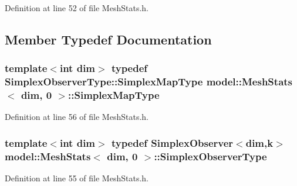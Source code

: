 Definition at line 52 of file Mesh\+Stats.\+h.



\subsection{Member Typedef Documentation}
\hypertarget{structmodel_1_1_mesh_stats_3_01dim_00_010_01_4_a9432efdd50cd41d86ceff02400fc4801}{}
\subsubsection[{Simplex\+Map\+Type}]{\setlength{\rightskip}{0pt plus 5cm}template$<$int dim$>$ typedef {\bf Simplex\+Observer\+Type\+::\+Simplex\+Map\+Type} {\bf model\+::\+Mesh\+Stats}$<$ {\bf dim}, 0 $>$\+::{\bf Simplex\+Map\+Type}}\label{structmodel_1_1_mesh_stats_3_01dim_00_010_01_4_a9432efdd50cd41d86ceff02400fc4801}


Definition at line 56 of file Mesh\+Stats.\+h.

\hypertarget{structmodel_1_1_mesh_stats_3_01dim_00_010_01_4_adca31e4696e0ce0cf499436a2e8c0916}{}
\subsubsection[{Simplex\+Observer\+Type}]{\setlength{\rightskip}{0pt plus 5cm}template$<$int dim$>$ typedef {\bf Simplex\+Observer}$<${\bf dim},{\bf k}$>$ {\bf model\+::\+Mesh\+Stats}$<$ {\bf dim}, 0 $>$\+::{\bf Simplex\+Observer\+Type}}\label{structmodel_1_1_mesh_stats_3_01dim_00_010_01_4_adca31e4696e0ce0cf499436a2e8c0916}


Definition at line 55 of file Mesh\+Stats.\+h.



